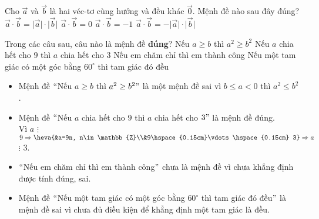 \begin{ex}%
Cho $\overrightarrow{a} $ và $\overrightarrow{b} $ là hai véc-tơ cùng hướng và đều khác $\overrightarrow{0} $. Mệnh đề nào sau đây đúng?
\choice
{\True $\overrightarrow{a} \cdot \overrightarrow{b}=\big| \overrightarrow{a}\big| \cdot \big| \overrightarrow{b}\big| $}
{$\overrightarrow{a} \cdot \overrightarrow{b}=0$}
{$\overrightarrow{a} \cdot \overrightarrow{b}=-1$}
{$\overrightarrow{a} \cdot \overrightarrow{b}=-\big| \overrightarrow{a}\big| \cdot \big| \overrightarrow{b}\big| $}
\end{ex}

\begin{ex}%
Trong các câu sau, câu nào là mệnh đề \textbf{đúng}?
\choice
{Nếu $a\ge b$ thì $a^2\ge b^2$}
{\True Nếu $a$ chia hết cho $9$ thì $a$ chia hết cho $3$}
{Nếu em chăm chỉ thì em thành công}
{Nếu một tam giác có một góc bằng $60^\circ $ thì tam giác đó đều}
\loigiai
{
\begin{itemize}
\item Mệnh đề $``$Nếu $a\ge b$ thì $a^2\ge b^2"$ là một mệnh đề sai vì $b\le a < 0$ thì $a^2\le b^2$ .
\item Mệnh đề $``$Nếu $a$ chia hết cho $9$ thì $a$ chia hết cho $3"$ là mệnh đề đúng.\\
Vì $a$ $\vdots$ $9\Rightarrow \heva{&a=9n, n\in \mathbb{Z}\\&9\hspace{0.15cm}\vdots\hspace{0.15cm} 3}\Rightarrow a$ $\vdots$  $3$.
\item $``$Nếu em chăm chỉ thì em thành công$"$ chưa là mệnh đề vì chưa khẳng định được tính đúng, sai.
\item Mệnh đề $``$Nếu một tam giác có một góc bằng $60^\circ $ thì tam giác đó đều$"$ là mệnh đề sai vì chưa đủ điều kiện để khẳng định một tam giác là đều.
\end{itemize}
}
\end{ex}

